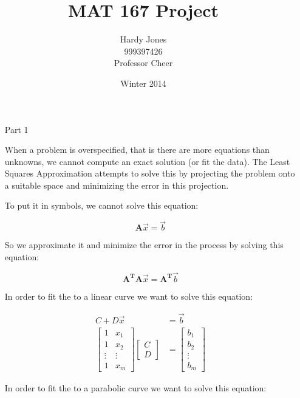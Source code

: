\documentclass[12pt,letterpaper]{article}
\title{MAT 167 Project\vspace{-2ex}}
\author{Hardy Jones\\
        999397426\\
        Professor Cheer\vspace{-2ex}}
\date{Winter 2014}
\begin{document}
  \maketitle

  \begin{enumerate}
    \item[Part 1]

      When a problem is overspecified, that is there are more equations than unknowns, we cannot compute an exact solution (or fit the data).
      The Least Squares Approximation attempts to solve this by projecting the problem onto a suitable space and minimizing the error in this projection.

      To put it in symbols, we cannot solve this equation:

      \[\mathbf{A}\vec{x} = \vec{b}\]

      So we approximate it and minimize the error in the process by solving this equation:

      \[\mathbf{A^T}\mathbf{A}\vec{x} = \mathbf{A^T}\vec{b}\]

      In order to fit the to a linear curve we want to solve this equation:

      \begin{align*}
        C + D\vec{x} &= \vec{b} \\
        \begin{bmatrix}
          1 & x_1 \\
          1 & x_2 \\
          \vdots & \vdots \\
          1 & x_m
        \end{bmatrix}
        \begin{bmatrix}
          C \\
          D
        \end{bmatrix}
        &=
        \begin{bmatrix}
          b_1 \\
          b_2 \\
          \vdots \\
          b_m
        \end{bmatrix}
      \end{align*}

      In order to fit the to a parabolic curve we want to solve this equation:


\end{enumerate}
\end{document}
